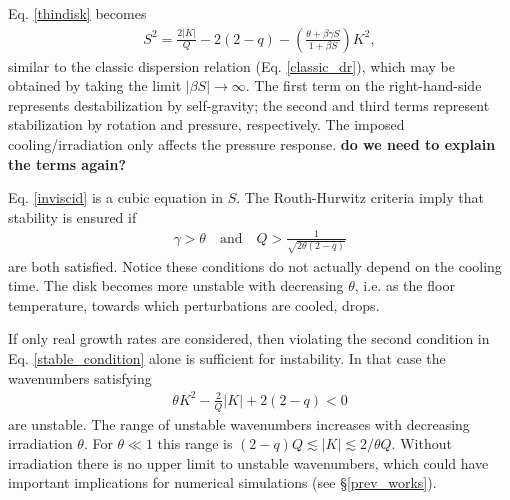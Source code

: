 Eq. \ref{thindisk} becomes 
\begin{align}\label{inviscid}
  S^2 = \frac{2|K|}{Q} - 2(2-q) - \left(\frac{\theta + \beta \gamma
    S}{1+\beta S}\right)K^2, 
\end{align}
similar to the classic dispersion relation
(Eq. \ref{classic_dr}), which may be obtained by taking the limit
$|\beta S|\to\infty$. %
The first term on the right-hand-side represents destabilization by self-gravity; 
the second and third terms represent stabilization by rotation and
pressure, respectively. The imposed cooling/irradiation only affects the
pressure response. {\bf do we need to explain the terms again?}

Eq. \ref{inviscid} is a cubic equation in $S$. The 
Routh-Hurwitz criteria imply that stability is ensured if 
\begin{align}\label{stable_condition}
  \gamma > \theta \quad \text{and} \quad 
  Q > \frac{1}{\sqrt{2\theta(2-q)}} 
\end{align}
are both satisfied. 
Notice these conditions do not actually
depend on the cooling time. 
The disk becomes more unstable with decreasing $\theta$, 
i.e. as the floor temperature, towards which perturbations are cooled, drops. 

If only real growth rates are considered, then violating the second
condition in Eq. \ref{stable_condition} alone is sufficient for instability. 
In that case the wavenumbers satisfying
\begin{align}
  \theta K^2 - \frac{2}{Q}|K| + 2(2-q) < 0 
\end{align}
are unstable. The range of unstable wavenumbers
increases with decreasing irradiation $\theta$. For $\theta\ll 1$ this range is 
$(2-q)Q\lesssim|K|\lesssim2/\theta Q$. Without irradiation there is no
upper limit to unstable wavenumbers, which could have important
implications for numerical simulations (see \S\ref{prev_works}). 

